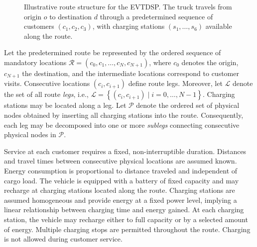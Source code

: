 \documentclass[3p,11pt,authoryear]{elsarticle}  %
\begin{document}
\begin{figure}[htbp!]

\caption{Illustrative route structure for the EVTDSP. The truck travels
from origin $o$ to destination $d$ through a predetermined sequence of
customers $(c_1,c_2,c_3)$, with charging stations $(s_1,\ldots,s_6)$
available along the route.}
\label{fig:evtdsp_route}
\end{figure}
Let the predetermined route be represented by the ordered sequence of mandatory locations $\mathcal{R}=(c_0,c_1,\ldots,c_N,c_{N+1})$, where $c_0$ denotes the origin, $c_{N+1}$ the destination, and the intermediate locations correspond to customer visits. Consecutive locations $(c_i,c_{i+1})$ define route legs. Moreover, let $\mathcal{L}$ denote the set of all route \emph{legs}, i.e., $\mathcal{L}=\left\{(c_i,c_{i+1}) \mid i=0,\ldots,N-1\right\}$. Charging stations may be located along a leg. Let $\mathcal{P}$ denote the ordered set of physical nodes obtained by inserting all charging stations into the route. Consequently, each {leg} may be decomposed into one or more \emph{sublegs} connecting consecutive physical nodes in $\mathcal{P}$.

Service at each customer requires a fixed, non-interruptible duration. Distances and travel times between consecutive physical locations are assumed known. %
Energy consumption is proportional to distance traveled and independent of cargo load. The vehicle is equipped with a battery of fixed capacity %
and may recharge at charging stations located along the route. Charging stations are assumed homogeneous and provide energy at a fixed power level, implying a linear relationship between charging time and energy gained. At each charging station, the vehicle may recharge either to full capacity or by a selected amount of energy. Multiple charging stops are permitted throughout the route. Charging is not allowed during customer service.
\end{document}
